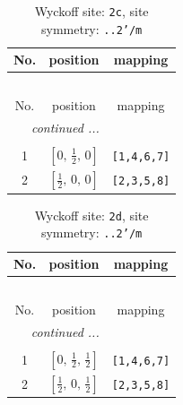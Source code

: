 \documentclass[fleqn,8pt]{jsarticle}
\begin{document}
\renewcommand{\arraystretch}{1.2}
\begin{longtable}{ccc}
\caption{Wyckoff site: {\tt 2c}, site symmetry: {\tt ..2'/m}}
 \\
 \hline \hline
No. & position & mapping \\ \hline \endfirsthead

\multicolumn{2}{l}{\tablename\ \thetable{}} \\
 \hline \hline
No. & position & mapping \\ \hline \endhead

 \hline \hline
\multicolumn{2}{r}{\footnotesize\it continued ...} \\ \endfoot

 \hline \hline
\multicolumn{2}{r}{} \\ \endlastfoot

1 & $\left[ 0,\, \frac{1}{2},\, 0 \right]$ & {\tt [1,4,6,7]} \\ \hline
2 & $\left[ \frac{1}{2},\, 0,\, 0 \right]$ & {\tt [2,3,5,8]} \\
\end{longtable}
\renewcommand{\arraystretch}{1.2}
\begin{longtable}{ccc}
\caption{Wyckoff site: {\tt 2d}, site symmetry: {\tt ..2'/m}}
 \\
 \hline \hline
No. & position & mapping \\ \hline \endfirsthead

\multicolumn{2}{l}{\tablename\ \thetable{}} \\
 \hline \hline
No. & position & mapping \\ \hline \endhead

 \hline \hline
\multicolumn{2}{r}{\footnotesize\it continued ...} \\ \endfoot

 \hline \hline
\multicolumn{2}{r}{} \\ \endlastfoot

1 & $\left[ 0,\, \frac{1}{2},\, \frac{1}{2} \right]$ & {\tt [1,4,6,7]} \\ \hline
2 & $\left[ \frac{1}{2},\, 0,\, \frac{1}{2} \right]$ & {\tt [2,3,5,8]} \\
\end{longtable}
\renewcommand{\arraystretch}{1.2}
\end{document}
